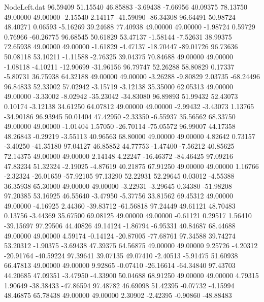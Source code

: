 \begin{filecontents}{NodeLeft.dat}
  96.59409   51.15540   46.85883    -3.69438   -7.66956   40.09375   78.13750   49.00000   49.00000   -2.15540    2.14117  -41.59090  -86.34308
  96.64491   50.98724   48.40271     0.06593   -5.16269   39.24688   77.40938   49.00000   49.00000   -1.98724    0.59729    0.76966  -60.26775
  96.68545   50.61829   53.47137    -1.58144   -7.52631   38.99375   72.65938   49.00000   49.00000   -1.61829   -4.47137  -18.70447  -89.01726
  96.73636   50.08118   53.10211    -1.11588   -2.76325   39.04375   70.84688   49.00000   49.00000   -1.08118   -4.10211  -12.90699  -31.96156
  96.79747   52.26288   58.80829     0.17337   -5.80731   36.75938   64.32188   49.00000   49.00000   -3.26288   -9.80829    2.03735  -68.24496
  96.84833   52.33002   57.02942    -3.15719   -3.12138   35.35000   62.05313   49.00000   49.00000   -3.33002   -8.02942  -35.23042  -34.83080
  96.89893   51.99432   52.43073     0.10174   -3.12138   34.61250   64.07812   49.00000   49.00000   -2.99432   -3.43073    1.13765  -34.90186
  96.93945   50.01404   47.42950    -2.33350   -6.55937   35.56562   68.33750   49.00000   49.00000   -1.01404    1.57050  -26.70114  -75.05572
  96.99007   44.17358   48.26843    -0.29219   -3.55113   40.96563   68.80000   49.00000   49.00000    4.82642    0.73157   -3.40250  -41.35180
  97.04127   46.85852   44.77753    -1.47400   -7.56212   40.85625   72.14375   49.00000   49.00000    2.14148    4.22247  -16.46372  -84.46425
  97.09216   47.83234   51.32324    -2.19025   -4.87619   40.21875   67.91250   49.00000   49.00000    1.16766   -2.32324  -26.01659  -57.92105
  97.13290   52.22931   52.29645     0.03012   -4.55388   36.35938   65.30000   49.00000   49.00000   -3.22931   -3.29645    0.34380  -51.98208
  97.20385   53.16925   46.55640    -3.47950   -5.37756   33.81562   69.45312   49.00000   49.00000   -4.16925    2.44360  -39.83712  -61.56818
  97.24449   49.61121   48.70483     0.13756   -3.44369   35.67500   69.08125   49.00000   49.00000   -0.61121    0.29517    1.56410  -39.15697
  97.29506   44.40826   49.14124    -1.86794   -6.95331   40.84687   68.44688   49.00000   49.00000    4.59174   -0.14124  -20.87005  -77.68761
  97.34588   39.74274   53.20312    -1.90375   -3.69438   47.39375   64.56875   49.00000   49.00000    9.25726   -4.20312  -20.91764  -40.59224
  97.39641   39.07135   49.07410    -2.40513   -5.91475   51.60938   66.47813   49.00000   49.00000    9.92865   -0.07410  -26.16614  -64.34840
  97.43703   44.20685   47.09351    -3.47950   -4.33900   50.04688   68.91250   49.00000   49.00000    4.79315    1.90649  -38.38433  -47.86594
  97.48782   46.69098   51.42395    -0.07732   -4.15994   48.46875   65.78438   49.00000   49.00000    2.30902   -2.42395   -0.90860  -48.88483

\end{filecontents}
